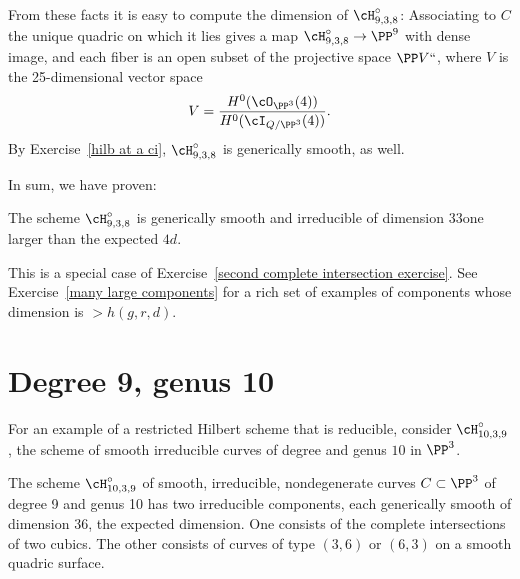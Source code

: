 From these facts it is easy to compute the dimension of
$\cH^\circ_{9,3,8}$: Associating to $C$ the unique quadric on which it
lies gives a map $\cH^\circ_{9,3,8} \to \PP^9$ with dense image, and
each fiber is an open subset of the projective space $\PP V` `$, where $V$
is the 25-dimensional vector space
$$
V = \frac{H^0(\cO_{\PP^3}(4))}{H^0(\cI_{Q/\PP^3}(4))}.
$$
By Exercise~\ref{hilb at a ci}, $\cH^\circ_{9,3,8}$ is generically smooth,
as well.

In sum, we have proven:
\begin{proposition}
 The scheme $\cH^\circ_{9,3,8}$ is generically smooth and irreducible
 of dimension $33$\emdash one larger than the expected $4d$.
\end{proposition}

This is a special case of Exercise~\ref{second complete intersection
exercise}.
See Exercise~\ref{many large components} for a rich set of examples of
components whose dimension
is $>h(g,r,d)$.

\section{Degree 9, genus 10}\label{deg9 section}

For an example of a restricted Hilbert scheme that is reducible, consider
$\cH^\circ_{10,3,9}$, the
scheme of smooth irreducible curves of degree \9 and genus $10$ in $\PP^{3}$.

\begin{proposition}\label{types of 10,3,9}
 The scheme $\cH^\circ_{10,3,9}$
of smooth, irreducible, nondegenerate
 curves $C \subset \PP^3$ of degree 9 and genus 10 has two irreducible
 components, each generically smooth of dimension 36, the expected
 dimension. One consists of the complete intersections of two cubics. The
 other consists of curves of type $(3,6)$ or $(6,3)$ on a smooth quadric
 surface. \end{proposition}

